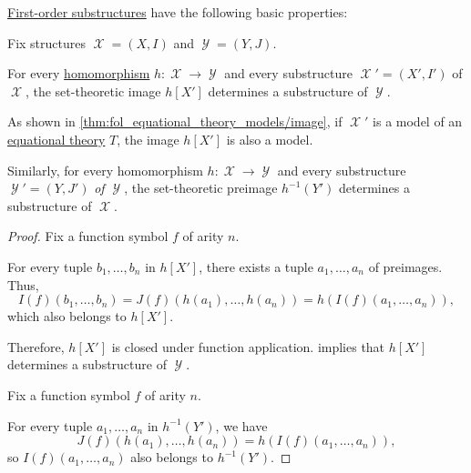 \begin{proposition}\label{thm:def:fol_substructure}
  \hyperref[def:fol_substructure]{First-order substructures} have the following basic properties:
  \begin{thmenum}
     Fix structures \( \mscrX = (X, I) \) and \( \mscrY = (Y, J) \).

    For every \hyperref[def:fol_homomorphism]{homomorphism} \( h: \mscrX \to \mscrY \) and every substructure \( \mscrX' = (X', I') \) of \( \mscrX \), the set-theoretic image \( h[X'] \) determines a substructure of \( \mscrY \).

    As shown in \cref{thm:fol_equational_theory_models/image}, if \( \mscrX' \) is a model of an \hyperref[def:fol_equational_theory]{equational theory} \( T \), the image \( h[X'] \) is also a model.

     Similarly, for every homomorphism \( h: \mscrX \to \mscrY \) and every substructure \( \mscrY' = (Y, J') \) \emph{of \( \mscrY \)}, the set-theoretic preimage \( h^{-1}(Y') \) determines a substructure of \( \mscrX \).
  \end{thmenum}
\end{proposition}
\begin{proof}
   Fix a function symbol \( f \) of arity \( n \).

  For every tuple \( b_1, \ldots, b_n \) in \( h[X'] \), there exists a tuple \( a_1, \ldots, a_n \) of preimages. Thus,
  \begin{equation*}
    I(f)(b_1, \ldots, b_n)
    =
    J(f)(h(a_1), \ldots, h(a_n))
    =
    h(I(f)(a_1, \ldots, a_n)),
  \end{equation*}
  which also belongs to \( h[X'] \).

  Therefore, \( h[X'] \) is closed under function application.  implies that \( h[X'] \) determines a substructure of \( \mscrY \).

   Fix a function symbol \( f \) of arity \( n \).

  For every tuple \( a_1, \ldots, a_n \) in \( h^{-1}(Y') \), we have
  \begin{equation*}
    J(f)(h(a_1), \ldots, h(a_n))
    =
    h(I(f)(a_1, \ldots, a_n)),
  \end{equation*}
  so \( I(f)(a_1, \ldots, a_n) \) also belongs to \( h^{-1}(Y') \).
\end{proof}

